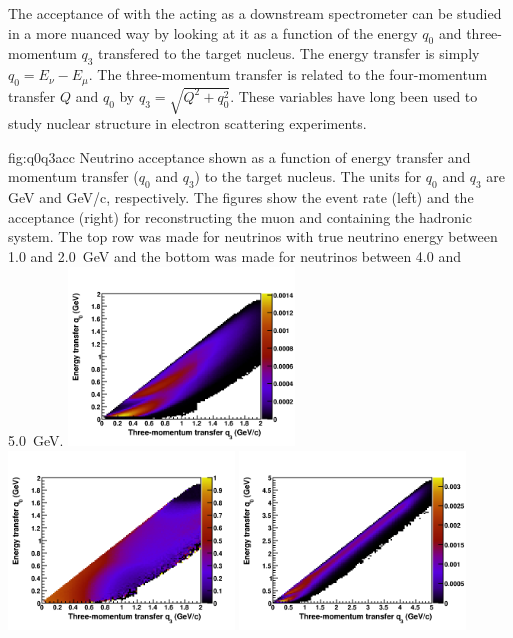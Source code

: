 The acceptance of  with the  acting as a downstream spectrometer can be studied in a more nuanced way by looking at it as a function of the energy $q_0$ and three-momentum $q_3$  transfered to the target nucleus. The energy transfer is simply $q_0=E_\nu - E_\mu$. The three-momentum transfer is related to the four-momentum transfer $Q$ and $q_0$ by $q_3 = \sqrt{Q^2 + q_0^2}$. These variables have long been used to study nuclear structure in electron scattering experiments. 

\begin{dunefigure}{fig:q0q3acc}
{Neutrino acceptance shown as a function of energy transfer and momentum transfer ($q_0$ and $q_3$) to the target nucleus. The units for $q_0$ and $q_3$ are GeV and GeV/c, respectively. The figures show the event rate (left) and the acceptance (right) for reconstructing the muon and containing the hadronic system. The top row was made for neutrinos with true neutrino energy between \num{1.0} and \SI{2.0}{GeV} and the bottom was made for neutrinos between \num{4.0} and \SI{5.0}{GeV}.}
      \includegraphics[width=0.45\textwidth]{graphics/rate_q0q3_Ev_1000_2000.png}
      \includegraphics[width=0.45\textwidth]{graphics/eff_q0q3_Ev_1000_2000.png}
      \includegraphics[width=0.45\textwidth]{graphics/rate_q0q3_Ev_4000_5000.png}

\end{dunefigure}
